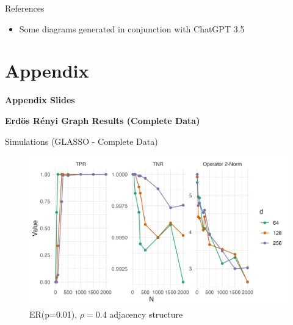 \documentclass{beamer}
\begin{document}
\begin{frame}[allowframebreaks]{References}
    \begin{itemize}
    \item Some diagrams generated in conjunction with ChatGPT 3.5
    \end{itemize}
    \printbibliography 
\end{frame}



\section*{Appendix}

\begin{frame}{}
\bf{\LARGE Appendix Slides}    
\end{frame}


\begin{frame}{}
    \bf{\LARGE Erd\"os R\'enyi Graph Results (Complete Data)}    
\end{frame}
    


\begin{frame}{Simulations (GLASSO - Complete Data)}
    \begin{figure}
        \centering 
        \includegraphics[scale=0.65]{glasso_complete_ER_FixN_01.png}
        \caption{ER(p=0.01), $\rho=0.4$ adjacency structure}
    \end{figure}
\end{frame}
\end{document}
